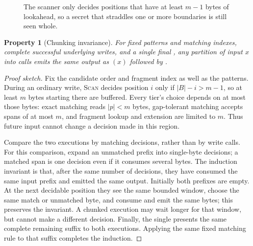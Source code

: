 \documentclass[10pt,twocolumn]{article}
\newcommand{\code}[1]{\textup{\texttt{\detokenize{#1}}}}
\newtheorem{property}{Property}
\begin{document}
\begin{figure}[t]
\centering
{}
\caption{The scanner only decides positions that have at least $m{-}1$ bytes of
lookahead, so a secret that straddles one or more \code{Write} boundaries is
still seen whole.}
\label{fig:buffer}
\end{figure}

\begin{samepage}
\begin{property}[Chunking invariance]
\label{prop:chunk}
For fixed patterns and matching indexes, complete successful underlying writes,
and a single final \code{Flush}, any partition of input $x$ into \code{Write}
calls emits the same output as \code{Write}$(x)$ followed by \code{Flush}.
\end{property}
\end{samepage}
\begin{proof}[Proof sketch]
Fix the candidate order and fragment index as well as the patterns. During an
ordinary write, \textsc{Scan} decides position $i$ only if $|B|-i>m-1$, so at
least $m$ bytes starting there are buffered. Every tier's choice depends on at
most those bytes: exact matching reads $|p|<m$ bytes, gap-tolerant matching accepts
spans of at most $m$, and fragment lookup and extension are limited to $m$.
Thus future input cannot change a decision made in this region.

Compare the two executions by matching decisions, rather than by write calls.
For this comparison, expand an unmatched prefix into single-byte decisions;
a matched span is one decision even if it consumes several bytes.
The induction invariant is that, after the same number of decisions, they have
consumed the same input prefix and emitted the same output. Initially both
prefixes are empty. At the next decidable position they see the same bounded
window, choose the same match or unmatched byte, and consume and emit the same
bytes; this preserves the invariant. A chunked execution may wait longer for
that window, but cannot make a different decision. Finally, the single
\code{Flush} presents the same complete remaining suffix to both executions.
Applying the same fixed matching rule to that suffix completes the induction.
\end{proof}
\end{document}
